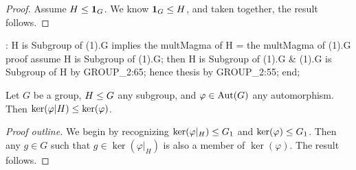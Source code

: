 \begin{proof}
Assume $H\leq\mathbf{1}_{G}$. We know
$\mathbf{1}_{G}\leq H$, and taken together, the result follows.
\end{proof}

\nwenddocs{}\endmoddef\nwstartdeflinemarkup{}\nwenddeflinemarkup
{}: H is Subgroup of (1).G implies the multMagma of H = the multMagma of (1).G
proof
  assume H is Subgroup of (1).G;
  then H is Subgroup of (1).G & (1).G is Subgroup of H by GROUP_2:65;
  hence thesis by GROUP_2:55;
end;
\eatline
{}\nwendcode{}\nwdocspar

\begin{theorem}
Let $G$ be a group, $H\leq G$ any subgroup, and $\varphi\in\operatorname{Aut}(G)$
any automorphism.
Then $\ker(\varphi|H)\leq\ker(\varphi)$.
\end{theorem}

\begin{proof}[Proof outline]
  We begin by recognizing $\ker(\varphi|_{H})\leq G_{1}$ and
  $\ker(\varphi)\leq G_{1}$. Then any $g\in G$ such that
  $g\in\ker(\varphi|_{H})$ is also a member of $\ker(\varphi)$. The
  result follows.
\end{proof}

